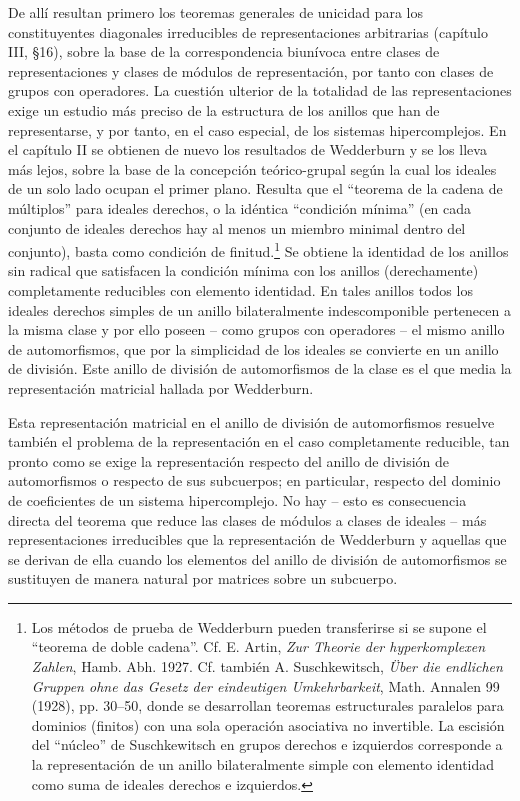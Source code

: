 \documentclass[11pt]{article}
\begin{document}
De allí resultan primero los teoremas generales de unicidad para los constituyentes diagonales irreducibles de representaciones arbitrarias (capítulo III, §16), sobre la base de la correspondencia biunívoca entre clases de representaciones y clases de módulos de representación, por tanto con clases de grupos con operadores. La cuestión ulterior de la totalidad de las representaciones exige un estudio más preciso de la estructura de los anillos que han de representarse, y por tanto, en el caso especial, de los sistemas hipercomplejos. En el capítulo II se obtienen de nuevo los resultados de Wedderburn y se los lleva más lejos, sobre la base de la concepción teórico-grupal según la cual los ideales de un solo lado ocupan el primer plano. Resulta que el ``teorema de la cadena de múltiplos'' para ideales derechos, o la idéntica ``condición mínima'' (en cada conjunto de ideales derechos hay al menos un miembro minimal dentro del conjunto), basta como condición de finitud.\footnote{Los métodos de prueba de Wedderburn pueden transferirse si se supone el ``teorema de doble cadena''. Cf. E. Artin, \emph{Zur Theorie der hyperkomplexen Zahlen}, Hamb. Abh. 1927. Cf. también A. Suschkewitsch, \emph{Über die endlichen Gruppen ohne das Gesetz der eindeutigen Umkehrbarkeit}, Math. Annalen 99 (1928), pp. 30--50, donde se desarrollan teoremas estructurales paralelos para dominios (finitos) con una sola operación asociativa no invertible. La escisión del ``núcleo'' de Suschkewitsch en grupos derechos e izquierdos corresponde a la representación de un anillo bilateralmente simple con elemento identidad como suma de ideales derechos e izquierdos.} Se obtiene la identidad de los anillos sin radical que satisfacen la condición mínima con los anillos (derechamente) completamente reducibles con elemento identidad. En tales anillos todos los ideales derechos simples de un anillo bilateralmente indescomponible pertenecen a la misma clase y por ello poseen -- como grupos con operadores -- el mismo anillo de automorfismos, que por la simplicidad de los ideales se convierte en un anillo de división. Este anillo de división de automorfismos de la clase es el que media la representación matricial hallada por Wedderburn.

Esta representación matricial en el anillo de división de automorfismos resuelve también el problema de la representación en el caso completamente reducible, tan pronto como se exige la representación respecto del anillo de división de automorfismos o respecto de sus subcuerpos; en particular, respecto del dominio de coeficientes de un sistema hipercomplejo. No hay -- esto es consecuencia directa del teorema que reduce las clases de módulos a clases de ideales -- más representaciones irreducibles que la representación de Wedderburn y aquellas que se derivan de ella cuando los elementos del anillo de división de automorfismos se sustituyen de manera natural por matrices sobre un subcuerpo.
\end{document}
